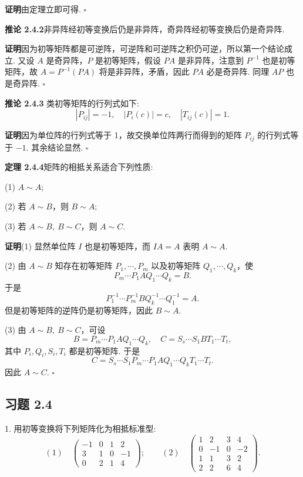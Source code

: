 \documentclass[UTF8,12pt,a4paper,fontset=fandol]{ctexart}
\begin{document}
\noindent\textbf{证明}\quad 由定理立即可得. $\square$

\noindent\textbf{推论 2.4.2}\quad 非异阵经初等变换后仍是非异阵，奇异阵经初等变换后仍是奇异阵.

\noindent\textbf{证明}\quad 因为初等矩阵都是可逆阵，可逆阵和可逆阵之积仍可逆，所以第一个结论成立. 又设 $A$ 是奇异阵，$P$ 是初等矩阵，假设 $PA$ 是非异阵，注意到 $P^{-1}$ 也是初等矩阵，故 $A=P^{-1}(PA)$ 将是非异阵，矛盾，因此 $PA$ 必是奇异阵. 同理 $AP$ 也是奇异阵. $\square$

\noindent\textbf{推论 2.4.3} 类初等矩阵的行列式如下:
\[
|P_{ij}|=-1,\quad |P_i(c)|=c,\quad |T_{ij}(c)|=1.
\]

\noindent\textbf{证明}\quad 因为单位阵的行列式等于 1，故交换单位阵两行而得到的矩阵 $P_{ij}$ 的行列式等于 $-1$. 其余结论显然. $\square$

\noindent\textbf{定理 2.4.4}\quad 矩阵的相抵关系适合下列性质:

(1) $A\sim A$;

(2) 若 $A\sim B$，则 $B\sim A$;

(3) 若 $A\sim B,\ B\sim C$，则 $A\sim C$.

\noindent\textbf{证明}\quad (1) 显然单位阵 $I$ 也是初等矩阵，而 $IA=A$ 表明 $A\sim A$.

(2) 由 $A\sim B$ 知存在初等矩阵 $P_1,\cdots,P_m$ 以及初等矩阵 $Q_1,\cdots,Q_k$，使
\[
P_m\cdots P_1AQ_1\cdots Q_k=B.
\]
于是
\[
P_1^{-1}\cdots P_m^{-1}BQ_k^{-1}\cdots Q_1^{-1}=A.
\]
但是初等矩阵的逆阵仍是初等矩阵，因此 $B\sim A$.

(3) 由 $A\sim B,\ B\sim C$，可设
\[
B=P_m\cdots P_1AQ_1\cdots Q_k,\quad C=S_s\cdots S_1BT_1\cdots T_t,
\]
其中 $P_i,Q_i,S_i,T_i$ 都是初等矩阵. 于是
\[
C=S_s\cdots S_1P_m\cdots P_1AQ_1\cdots Q_kT_1\cdots T_t.
\]
因此 $A\sim C$. $\square$

\subsection*{习题 2.4}

1. 用初等变换将下列矩阵化为相抵标准型:
\[
(1)\quad
\left(\begin{array}{rrrr}
-1 & 0 & 1 & 2\\
3 & 1 & 0 & -1\\
0 & 2 & 1 & 4
\end{array}\right);
\qquad
(2)\quad
\left(\begin{array}{rrrr}
1 & 2 & 3 & 4\\
0 & -1 & 0 & -2\\
1 & 1 & 3 & 2\\
2 & 2 & 6 & 4
\end{array}\right).
\]
\end{document}
